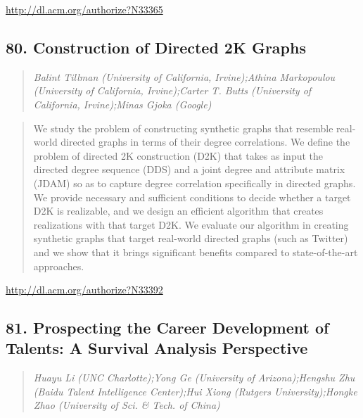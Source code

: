 \documentclass{article}
\begin{document}
\href{http://dl.acm.org/authorize?N33365}{http://dl.acm.org/authorize?N33365}

\subsection{80. Construction of Directed 2K Graphs}

\begin{quote}
\footnotesize{\textit{Balint Tillman (University of California, Irvine);Athina Markopoulou (University of California, Irvine);Carter T. Butts (University of California, Irvine);Minas Gjoka (Google)}}

\end{quote}

\begin{quote}
We study the problem of constructing synthetic graphs that resemble real-world directed graphs in terms of their degree correlations. We define the problem of directed 2K construction (D2K) that takes as input the directed degree sequence (DDS) and a joint degree and attribute matrix (JDAM) so as to capture degree correlation specifically in directed graphs. We provide necessary and sufficient conditions to decide whether a target D2K is realizable, and we design an efficient algorithm that creates realizations with that target D2K. We evaluate our algorithm in creating synthetic graphs that target real-world directed graphs (such as Twitter) and we show that it brings significant benefits compared to state-of-the-art approaches.
\end{quote}

\href{http://dl.acm.org/authorize?N33392}{http://dl.acm.org/authorize?N33392}

\subsection{81. Prospecting the Career Development of Talents: A Survival Analysis Perspective}

\begin{quote}
\footnotesize{\textit{Huayu Li (UNC Charlotte);Yong Ge (University of Arizona);Hengshu Zhu (Baidu Talent Intelligence Center);Hui Xiong (Rutgers University);Hongke Zhao (University of Sci. \& Tech. of China)}}

\end{quote}
\end{document}
